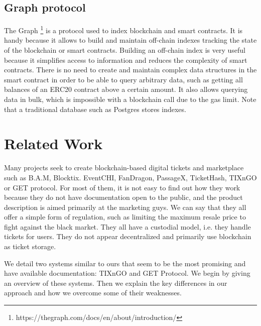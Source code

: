 \documentclass[a4paper,11pt,oneside]{report}
\begin{document}
\section{Graph protocol}
The Graph \footnote{https://thegraph.com/docs/en/about/introduction/} is a protocol used to index blockchain and smart contracts. It is handy because it allows to build and maintain off-chain indexes tracking the state of the blockchain or smart contracts. Building an off-chain index is very useful because it simplifies access to information and reduces the complexity of smart contracts. There is no need to create and maintain complex data structures in the smart contract in order to be able to query arbitrary data, such as getting all balances of an ERC20 contract above a certain amount. It also allows querying data in bulk, which is impossible with a blockchain call due to the gas limit. Note that a traditional database such as Postgres stores indexes.

\chapter{Related Work}
Many projects seek to create blockchain-based digital tickets and marketplace such as B.A.M, Blocktix. EventCHI, FanDragon, PassageX, TicketHash, TIXnGO or GET protocol. For most of them, it is not easy to find out how they work because they do not have documentation open to the public, and the product description is aimed primarily at the marketing guys. We can say that they all offer a simple form of regulation, such as limiting the maximum resale price to fight against the black market. They all have a custodial model, i.e. they handle tickets for users. They do not appear decentralized and primarily use blockchain as ticket storage.

We detail two systems similar to ours that seem to be the most promising and have available documentation: TIXnGO and GET Protocol. We begin by giving an overview of these systems. Then we explain the key differences in our approach and how we overcome some of their weaknesses.
\end{document}
